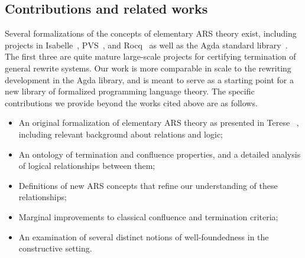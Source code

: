\subsection{Contributions and related works}
Several formalizations of the concepts of elementary ARS theory exist, including projects in Isabelle~\cite{isabelleFormalization}, PVS~\cite{trs}, and Rocq~\cite{coqARS} as well as the Agda standard library~\cite{AgdaLibraryRewriting}.
The first three are quite mature large-scale projects for certifying termination of
general rewrite systems.  Our work is more comparable in scale to the rewriting development in the
Agda library, and is meant to serve as a starting point for a new library of formalized
programming language theory.  The specific contributions we provide beyond the works cited above
are as follows.
\begin{itemize} \label{list:ourContributions}
  \item An original formalization of elementary ARS theory as presented in Terese
 ~\cite{Terese}, including relevant background about relations and logic;
  \item An ontology of termination and confluence properties, and a detailed analysis of logical relationships between them;
  \item Definitions of new ARS concepts that refine our understanding of these relationships;
  \item Marginal improvements to classical confluence and termination criteria;
  \item An examination of several distinct notions of well-foundedness
  in the constructive setting.
\end{itemize}

